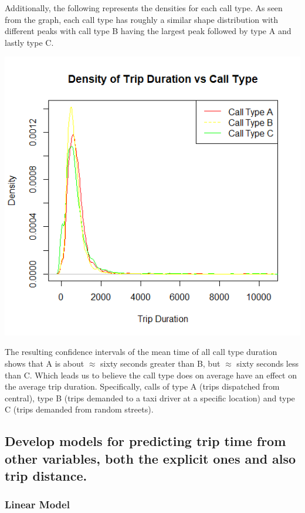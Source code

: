 \documentclass{article}
\numberwithin{equation}{section}
\begin{document}
Additionally, the following represents the densities for each call type. As seen from the graph, each call type has roughly a similar shape distribution with different peaks with call type B having the largest peak followed by type A and lastly type C. 
\begin{center}
\includegraphics[scale=0.8]{Density_of_Trip_Duration_vs_Call_Type.png}\\    
\end{center}
The resulting confidence intervals of the mean time of all call type duration shows that A is about  $\approx$ sixty seconds greater than B, but $\approx$ sixty seconds less than C. Which leads us to believe the call type does on average have an effect on the average trip duration. Specifically, calls of type A (trips dispatched from central), type B (trips demanded to a taxi driver at a specific location) and type C (trips demanded from random streets). 

\subsection{Develop models for predicting trip time from other variables, both the explicit ones and also trip distance.}

\subsubsection{Linear Model}
\end{document}
